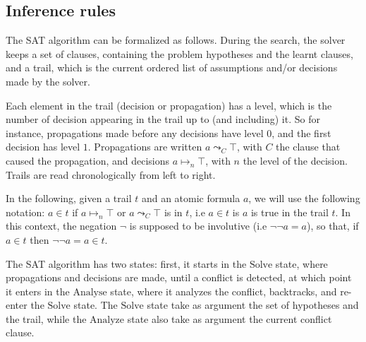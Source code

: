 \documentclass{article}
\begin{document}
\subsection{Inference rules}

The SAT algorithm can be formalized as follows. During the search, the solver keeps
a set of clauses, containing the problem hypotheses and the learnt clauses, and
a trail, which is the current ordered list of assumptions and/or decisions made by
the solver.

Each element in the trail (decision or propagation) has a level, which is the number of decision
appearing in the trail up to (and including) it. So for instance, propagations made before any
decisions have level $0$, and the first decision has level $1$. Propagations are written
$a \leadsto_C \top$, with $C$ the clause that caused the propagation, and decisions
$a \mapsto_n \top$, with $n$ the level of the decision. Trails are read
chronologically from left to right.

In the following, given a trail $t$ and an atomic formula $a$, we will use the following notation:
$a \in t$ if $a \mapsto_n \top$ or $a \leadsto_C \top$ is in $t$, i.e $a \in t$ is $a$ is true
in the trail $t$. In this context, the negation $\neg$ is supposed to be involutive (i.e $\neg \neg a = a$),
so that, if $a \in t$ then $\neg \neg a = a \in t$.

The SAT algorithm has two states: first, it starts in the $\text{Solve}$ state, where propagations
and decisions are made, until a conflict is detected, at which point it enters in the $\text{Analyse}$
state, where it analyzes the conflict, backtracks, and re-enter the $\text{Solve}$ state.
The $\text{Solve}$ state take as argument the set of hypotheses and the trail, while
the $\text{Analyze}$ state also take as argument the current conflict clause.
\end{document}
